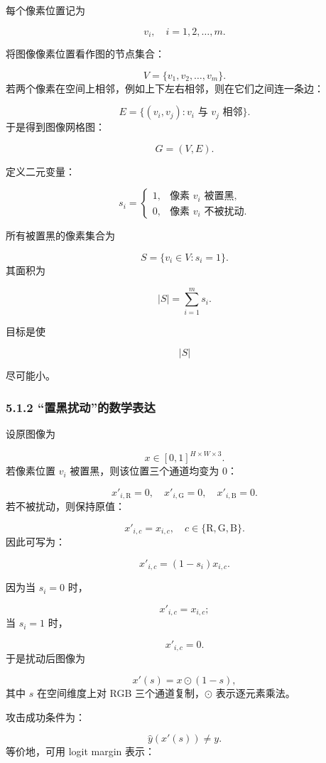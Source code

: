 ﻿\documentclass[UTF8,zihao=-4,fontset=none]{ctexart}
\begin{document}
每个像素位置记为

\[
v_i,\quad i=1,2,\ldots,m.
\]

将图像像素位置看作图的节点集合：

\[
V=\{v_1,v_2,\ldots,v_m\}.
\]
\noindent 若两个像素在空间上相邻，例如上下左右相邻，则在它们之间连一条边：

\[
E=\{(v_i,v_j):v_i\text{ 与 }v_j\text{ 相邻}\}.
\]
\noindent 于是得到图像网格图：

\[
G=(V,E).
\]

定义二元变量：

\[
s_i=
\begin{cases}
1, & \text{像素 }v_i\text{ 被置黑},\\
0, & \text{像素 }v_i\text{ 不被扰动}.
\end{cases}
\]

所有被置黑的像素集合为

\[
S=\{v_i\in V:s_i=1\}.
\]
\noindent 其面积为

\[
|S|=\sum_{i=1}^{m}s_i.
\]

目标是使

\[
|S|
\]

尽可能小。

\subsubsection*{5.1.2 “置黑扰动”的数学表达}
{}

设原图像为

\[
x\in[0,1]^{H\times W\times 3}.
\]
\noindent 若像素位置 \(v_i\) 被置黑，则该位置三个通道均变为 0：

\[
x'_{i,\mathrm{R}}=0,\quad x'_{i,\mathrm{G}}=0,\quad x'_{i,\mathrm{B}}=0.
\]
\noindent 若不被扰动，则保持原值：

\[
x'_{i,c}=x_{i,c},
\quad c\in\{\mathrm{R},\mathrm{G},\mathrm{B}\}.
\]
\noindent 因此可写为：

\[
x'_{i,c}=(1-s_i)x_{i,c}.
\]

因为当 \(s_i=0\) 时，

\[
x'_{i,c}=x_{i,c};
\]
\noindent 当 \(s_i=1\) 时，

\[
x'_{i,c}=0.
\]
\noindent 于是扰动后图像为

\[
x'(s)=x\odot(1-s),
\]
\noindent 其中 \(s\) 在空间维度上对 RGB 三个通道复制，\(\odot\) 表示逐元素乘法。

攻击成功条件为：

\[
\hat y(x'(s))\ne y.
\]
\noindent 等价地，可用 logit margin 表示：
\end{document}
